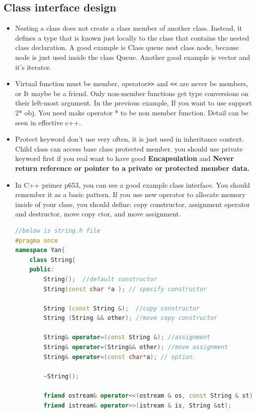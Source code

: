 \documentclass[a4paper,11pt,twoside]{book}
\begin{document}
\subsection{Class interface design}
\begin{itemize}
	
	\item Nesting a class does not create a class member of another class. Instead, it defines a type that is known just locally to the class that contains the nested class declaration.  A good example is Class queue nest class node,  because node is just used inside the class Queue. Another good example is vector and it's iterator.
	
	\item Virtual function must be member, operator\verb=>>= and \verb=<<= are never be members, or It maybe be a friend. Only non-member functions get type conversions on their left-most argument.  In the previous example, If you want to use support 2* obj, You need make operator * to be non member function.  Detail can be seen in effective c++.
	
	\item Protect keyword don't use very often, it is just used in inheritance context. Child class can access base class protected member. you should use private keyword first if you real want to have good \textbf{Encapsulation} and \textbf{Never return reference or pointer to a private or protected member data.}
	
	\item In C++ primer p653, you can see a good example class interface. You should remember it as a basic pattern.  If you use new operator to allocate memory inside of your class, you should define: copy constructor, assignment operator and destructor, move copy ctor, and move assignment.
	
\begin{lstlisting}[frame=single, language=c++]
//below is string.h file
#pragma once
namespace Yan{
	class String{
	public:
		String();  //default constructor
		String(const char *a ); // specify constructor
		
		String (const String &);  //copy constructor
		String (String && other); //move copy constructor
		
		String& operator=(const String &); //assignment
		String& operator=(String&& other); //move assignment
		String& operator=(const char*a); // option.
		
		~String();  
		
		friend ostream& operator<<(ostream & os, const String & st);
		friend istream& operator>>(istream & is, String &st);
		

\end{lstlisting}
\end{itemize}
\end{document}

